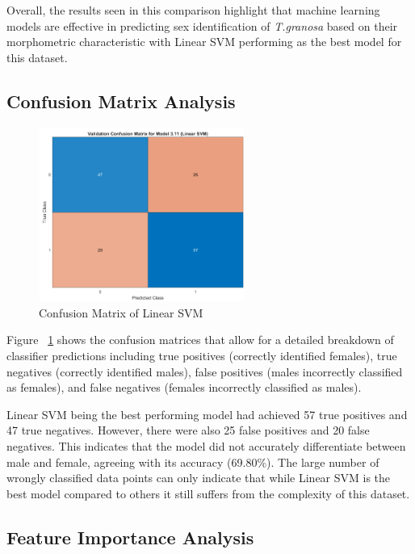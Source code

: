 Overall, the results seen in this comparison highlight that machine learning models are effective in predicting sex identification of \textit{T.granosa} based on their morphometric characteristic with Linear SVM performing as the best model for this dataset. 


\subsection{Confusion Matrix Analysis}
\begin{figure}[!htbp]
	\centering
	\includegraphics[width=0.6\textwidth]{figures/confusion-matrix.png}
	\caption{Confusion Matrix of Linear SVM}
	\label{fig:confusion-matrix}
\end{figure}

Figure ~\ref{fig:confusion-matrix} shows the confusion matrices that allow for a detailed breakdown of classifier predictions including true positives (correctly identified females), true negatives (correctly identified males), false positives (males incorrectly classified as females), and false negatives (females incorrectly classified as males).

Linear SVM being the best performing model had achieved 57 true positives and 47 true negatives. However, there were also 25 false positives and 20 false negatives. This indicates that the model did not accurately differentiate  between male and female, agreeing with its accuracy (69.80\%). The large number of wrongly classified data points can only indicate that while Linear SVM is the best model compared to others it still suffers from the complexity of this dataset. 

\newpage
\subsection{Feature Importance Analysis}

